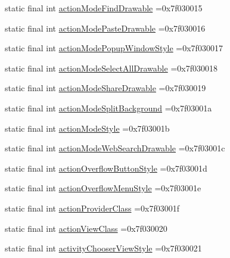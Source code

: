 \begin{DoxyCompactItemize}
static final int \mbox{\hyperlink{classbr_1_1unb_1_1cic_1_1mp_1_1marketmaster_1_1R_1_1attr_adf94a3776a3a559d4952dd7960e7c80f}{action\+Mode\+Find\+Drawable}} =0x7f030015
\item 
static final int \mbox{\hyperlink{classbr_1_1unb_1_1cic_1_1mp_1_1marketmaster_1_1R_1_1attr_a0dcd7ede104c179209bc9cdb19ed3357}{action\+Mode\+Paste\+Drawable}} =0x7f030016
\item 
static final int \mbox{\hyperlink{classbr_1_1unb_1_1cic_1_1mp_1_1marketmaster_1_1R_1_1attr_aded8051ba646d22d3890ac3a9e58a65d}{action\+Mode\+Popup\+Window\+Style}} =0x7f030017
\item 
static final int \mbox{\hyperlink{classbr_1_1unb_1_1cic_1_1mp_1_1marketmaster_1_1R_1_1attr_a4534e9015d60c162180fb7c279210d21}{action\+Mode\+Select\+All\+Drawable}} =0x7f030018
\item 
static final int \mbox{\hyperlink{classbr_1_1unb_1_1cic_1_1mp_1_1marketmaster_1_1R_1_1attr_a1406c46da78bb755e2593ca4bc1346ca}{action\+Mode\+Share\+Drawable}} =0x7f030019
\item 
static final int \mbox{\hyperlink{classbr_1_1unb_1_1cic_1_1mp_1_1marketmaster_1_1R_1_1attr_ab3ae1bab1484b33c1773ccaf39e150ba}{action\+Mode\+Split\+Background}} =0x7f03001a
\item 
static final int \mbox{\hyperlink{classbr_1_1unb_1_1cic_1_1mp_1_1marketmaster_1_1R_1_1attr_aa8673f2f632bf9702e3d10d35d40965b}{action\+Mode\+Style}} =0x7f03001b
\item 
static final int \mbox{\hyperlink{classbr_1_1unb_1_1cic_1_1mp_1_1marketmaster_1_1R_1_1attr_a915f8bc868adb5ef919581f253ae1484}{action\+Mode\+Web\+Search\+Drawable}} =0x7f03001c
\item 
static final int \mbox{\hyperlink{classbr_1_1unb_1_1cic_1_1mp_1_1marketmaster_1_1R_1_1attr_ad82d914fd2a0e95eb4f55e9e69050f11}{action\+Overflow\+Button\+Style}} =0x7f03001d
\item 
static final int \mbox{\hyperlink{classbr_1_1unb_1_1cic_1_1mp_1_1marketmaster_1_1R_1_1attr_a375656d1d096859af50e2162bb71d20c}{action\+Overflow\+Menu\+Style}} =0x7f03001e
\item 
static final int \mbox{\hyperlink{classbr_1_1unb_1_1cic_1_1mp_1_1marketmaster_1_1R_1_1attr_a81ecc80c1316b62e4fafe82898f085ee}{action\+Provider\+Class}} =0x7f03001f
\item 
static final int \mbox{\hyperlink{classbr_1_1unb_1_1cic_1_1mp_1_1marketmaster_1_1R_1_1attr_a778f3f79f8e4a9e348a43822c0229075}{action\+View\+Class}} =0x7f030020
\item 
static final int \mbox{\hyperlink{classbr_1_1unb_1_1cic_1_1mp_1_1marketmaster_1_1R_1_1attr_a9786791ae59b8cdbcf8749e4fe2270b0}{activity\+Chooser\+View\+Style}} =0x7f030021

\end{DoxyCompactItemize}
